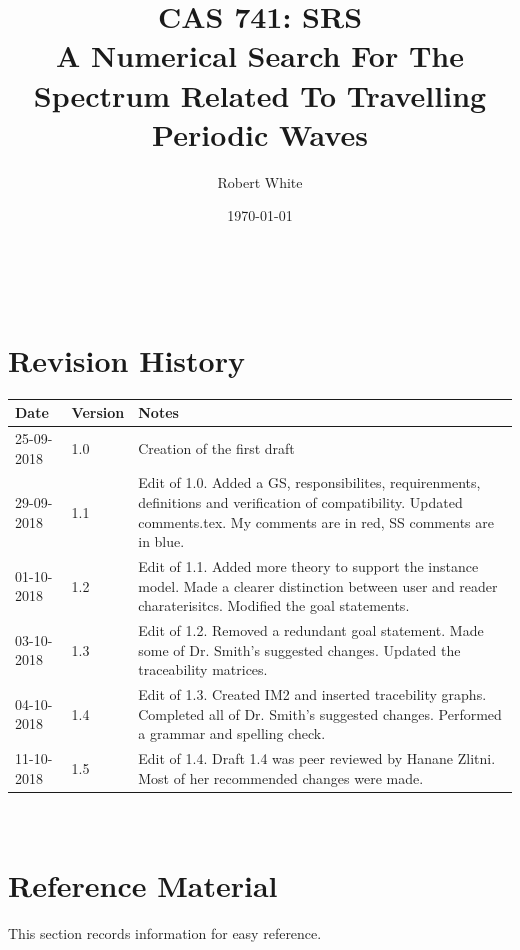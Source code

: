 \documentclass[12pt]{article}
\begin{document}
\title{CAS 741: SRS \\A Numerical Search For The Spectrum Related To Travelling 
Periodic Waves}  
\author{Robert White}
\date{\today}
	
\maketitle

~\newpage


\section{Revision History}

\begin{tabularx}{\textwidth}{p{3cm}p{2cm}X}
\toprule {\bf Date} & {\bf Version} & {\bf Notes}\\
\midrule
25-09-2018 & 1.0 & Creation of the first draft\\
29-09-2018 & 1.1 & Edit of 1.0. Added a GS, responsibilites, requirenments, 
definitions and verification of compatibility. Updated comments.tex. My 
comments are in red, SS comments are in blue.\\ 
01-10-2018 & 1.2 & Edit of 1.1. Added more theory to support the instance 
model. Made a clearer distinction between user and reader charaterisitcs. 
Modified the goal statements.  \\ 
03-10-2018 & 1.3 & Edit of 1.2. Removed a redundant goal statement. Made some 
of Dr. 
Smith's suggested changes. Updated the traceability matrices.  \\
04-10-2018 & 1.4 & Edit of 1.3. Created IM2 and inserted tracebility graphs. 
Completed all of Dr. Smith's suggested changes. Performed a grammar and 
spelling check.\\ 
11-10-2018 & 1.5& Edit of 1.4. Draft 1.4 was peer reviewed by Hanane Zlitni. 
Most of her recommended changes were made. \\
\bottomrule
\end{tabularx}

~\newpage

\section{Reference Material}

This section records information for easy reference.
\end{document}
